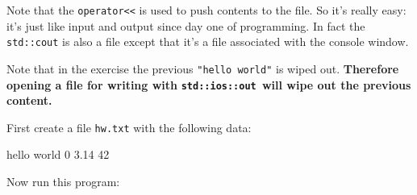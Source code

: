 Note that the \texttt{operator<<} is used to push contents to the file. So it's really easy: it's just like input and output since day one of programming. In fact the \texttt{std::cout} is also a file except that it's a file associated with the console window.


Note that in the exercise the previous \texttt{"hello world"} is wiped out. \textbf{Therefore opening a file for writing with }\texttt{\textbf{std::ios::out }}\textbf{will wipe out the previous content.}


\newpage{}

First create a file \texttt{hw.txt} with the following data:

\begin{console}
hello world
0 3.14
42
\end{console}

Now run this program:

